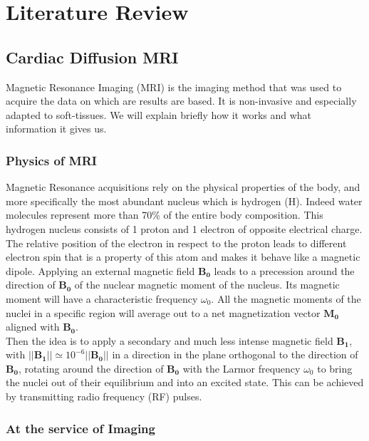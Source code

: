 \chapter{Literature Review}

\section{Cardiac Diffusion MRI}

Magnetic Resonance Imaging (MRI) is the imaging method that was used to acquire the data on which are results are based. It is non-invasive and especially adapted to soft-tissues. \cite{bakermans2008} We will explain briefly how it works and what information it gives us.

\subsection{Physics of MRI}

Magnetic Resonance acquisitions rely on the physical properties of the body, and more specifically the most abundant nucleus which is hydrogen (H). Indeed water molecules represent more than 70\% of the entire body composition. This hydrogen nucleus consists of 1 proton and 1 electron of opposite electrical charge. The relative position of the electron in respect to the proton leads to different electron spin that is a property of this atom and makes it behave like a magnetic dipole. Applying an external magnetic field $\mathbf{B_0}$ leads to a precession around the direction of $\mathbf{B_0}$ of the nuclear magnetic moment of the nucleus. Its magnetic moment will have a characteristic frequency $\omega_0$. All the magnetic moments of the nuclei in a specific region will average out to a net magnetization vector $\mathbf{M_0}$ aligned with $\mathbf{B_0}$.\\
Then the idea is to apply a secondary and much less intense magnetic field $\mathbf{B_1}$, with $||\mathbf{B_1}|| \simeq 10^{-6}||\mathbf{B_0}||$ in a direction in the plane orthogonal to the direction of $\mathbf{B_0}$, rotating around the direction of $\mathbf{B_0}$ with the Larmor frequency $\omega_0$ to bring the nuclei out of their equilibrium and into an excited state. This can be achieved by transmitting radio frequency (RF) pulses.\\

\subsection{At the service of Imaging}

